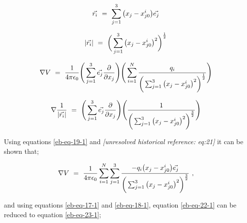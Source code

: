 \documentclass{article}
\begin{document}
\begin{equation} \label{eb-eq-17-1}
\vec{r_i} \hspace{0.125cm} = \hspace{0.125cm} \sum_{j=1}^{3} \big( x_{j} - x_{j0}^{i} \big)\vec{e_{j}} 
\end{equation}

\begin{equation} \label{eb-eq-18-1}
|\vec{r_i}| \hspace{0.125cm} = \hspace{0.125cm} \bigg( \sum_{j=1}^{3} \big( x_{j} - x_{j0}^{i} \big)^{2} \bigg)^{\frac{1}{2}}
\end{equation}

\begin{equation} \label{eb-eq-19-1}
\nabla{V} \hspace{0.125cm} = \hspace{0.125cm} \frac{1}{4\pi \epsilon_0}\Bigg( \sum_{j=1}^{3} \vec{e_j} \frac{\partial{}}{\partial{x_j}} \Bigg) \Bigg( \sum_{i=1}^{N} \frac{q_i}{\bigg( \sum_{j=1}^{3} \big( x_{j} - x_{j0}^{i} \big)^{2} \bigg)^{\frac{1}{2}}} \Bigg)
\end{equation}

\begin{equation} \label{eb-eq-20-1}
\nabla{\frac{1}{|\vec{r_i}|}} \hspace{0.125cm} = \hspace{0.125cm} \Bigg( \sum_{j=1}^{3} \vec{e_j} \frac{\partial{}}{\partial{x_j}} \Bigg) \Bigg( \frac{1}{\bigg( \sum_{j=1}^{3} \big( x_{j} - x_{j0}^{i} \big)^{2} \bigg)^{\frac{3}{2}}} \Bigg) 
\end{equation}







Using equations \ref{eb-eq-19-1} and \textit{[unresolved historical reference: eq:21]} it can be shown that;

\begin{equation} \label{eb-eq-22-1}
\nabla{V} \hspace{0.125cm} = \hspace{0.125cm} \frac{1}{4\pi \epsilon_0} \sum_{i=1}^{N} \sum_{j=1}^{3} \frac{-q_i\big( x_{j} - x_{j0}^{i} \big) \vec{e_{j}}}{{\bigg( \sum_{j=1}^{3} \big( x_{j} - x_{j0}^{i} \big)^{2} \bigg)^{\frac{3}{2}}}} \hspace{0.125cm} ,
\end{equation} 


and using equations \ref{eb-eq-17-1} and \ref{eb-eq-18-1}, equation \ref{eb-eq-22-1} can be reduced to equation \ref{eb-eq-23-1};
\end{document}
